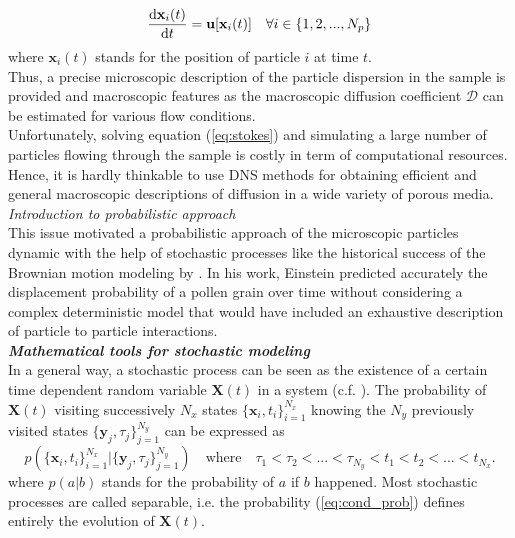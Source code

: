 \begin{equation}\label{eq:traject}
\dv{\textbf{x}_i(t)}{t}=\textbf{u}[\textbf{x}_i(t)]\quad\forall i\in\{1,2,...,N_p\}
\end{equation}
where $\textbf{x}_i(t)$ stands for the position of particle $i$ at time $t$.\\
Thus, a precise microscopic description of the particle dispersion in the sample is provided and macroscopic features as the macroscopic diffusion coefficient $\mathcal{D}$ can be estimated for various flow conditions.\\
Unfortunately, solving equation (\ref{eq:stokes}) and simulating a large number of particles flowing through the sample is costly in term of computational resources. Hence, it is hardly thinkable to use DNS methods for obtaining efficient and general macroscopic descriptions of diffusion in a wide variety of porous media.\\
\textit{Introduction to probabilistic approach}\\
This issue motivated a probabilistic approach of the microscopic particles dynamic with the help of stochastic processes like the historical success of the Brownian motion modeling by \citet{Einstein1906}. 
In his work, Einstein predicted accurately the displacement probability of a pollen grain over time without considering a complex deterministic model that would have included an exhaustive description of particle to particle interactions.\\
\textbf{\textit{Mathematical tools for stochastic modeling}}\\
In a general way, a stochastic process can be seen as the existence of a certain time dependent random variable $\textbf{X}(t)$ in a system (c.f. \citet[Sec. 3.1]{Gardiner1996}). The probability of $\textbf{X}(t)$ visiting successively $N_x$ states $\{\textbf{x}_i,t_i\}_{i=1}^{N_x}$ knowing the $N_y$ previously visited states $\{\textbf{y}_j,\tau_j\}_{j=1}^{N_y}$  can be expressed as
\begin{equation}\label{eq:cond_prob}
p(\{\textbf{x}_i,t_i\}_{i=1}^{N_x}|\{\textbf{y}_j,\tau_j\}_{j=1}^{N_y})\quad\textrm{where}\quad \tau_1<\tau_2<...<\tau_{N_y}<t_1<t_2<...<t_{N_x}.
\end{equation}
where $p(a|b)$ stands for the probability of $a$ if $b$ happened.
Most stochastic processes are called separable, i.e. the probability (\ref{eq:cond_prob}) defines entirely the evolution of $\textbf{X}(t)$.\\
